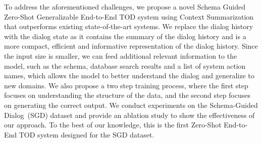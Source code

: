 To address the aforementioned challenges, we propose a novel Schema Guided Zero-Shot Generalizable End-to-End TOD system using Context Summarization
that outperforms existing state-of-the-art systems. We replace the dialog history with the dialog state as it contains the summary
of the dialog history and is a more compact, efficient and informative representation of the dialog history.
Since the input size is smaller, we can feed additional relevant information to the model, such as the schema, database search results and a list of
system action names, which allows the model to better understand the dialog and generalize to new domains.
We also propose a two step training process, where the first step focuses on understanding the structure of the
data, and the second step focuses on generating the correct output. We conduct experiments on the Schema-Guided Dialog~(SGD) dataset
and provide an ablation study to show the effectiveness of our approach. To the best of our knowledge,
this is the first Zero-Shot End-to-End TOD system designed for the SGD dataset.


